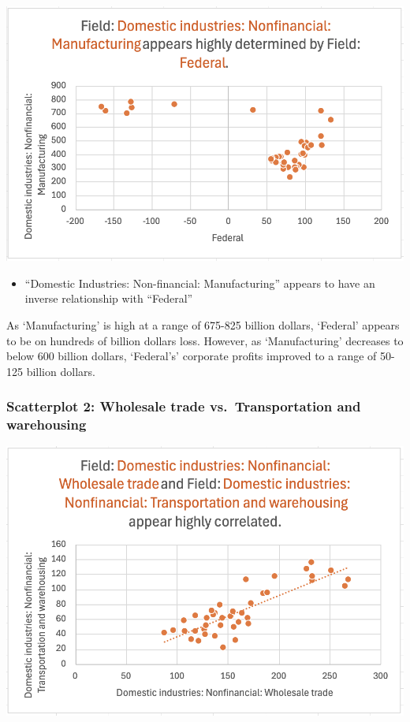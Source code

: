 \documentclass[
  letterpaper,
  DIV=11,
  numbers=noendperiod]{scrreprt}
\providecommand{\tightlist}{%
  \setlength{\itemsep}{0pt}\setlength{\parskip}{0pt}}\usepackage{longtable,booktabs,array}
\begin{document}
\includegraphics{./Excel_1_Unit/Week1_Janice/Week 1/Week 1 Friday/Scatterplot1.png}

\begin{itemize}
\tightlist
\item
  ``Domestic Industries: Non-financial: Manufacturing'' appears to have
  an inverse relationship with ``Federal''
\end{itemize}

As `Manufacturing' is high at a range of 675-825 billion dollars,
`Federal' appears to be on hundreds of billion dollars loss. However, as
`Manufacturing' decreases to below 600 billion dollars, `Federal's'
corporate profits improved to a range of 50-125 billion dollars.

\subsubsection{Scatterplot 2: Wholesale trade vs.~Transportation and
warehousing}\label{scatterplot-2-wholesale-trade-vs.-transportation-and-warehousing}

\includegraphics{./Excel_1_Unit/Week1_Janice/Week 1/Week 1 Friday/Scatterplot2.png}
\end{document}
